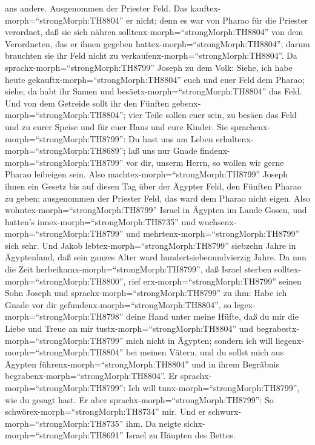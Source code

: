 ans andere.  Ausgenommen der Priester Feld. Das
kauftex-morph=``strongMorph:TH8804'' er nicht; denn es war von Pharao
für die Priester verordnet, daß sie sich nähren
solltenx-morph=``strongMorph:TH8804'' von dem Verordneten, das er ihnen
gegeben hattex-morph=``strongMorph:TH8804''; darum brauchten sie ihr
Feld nicht zu verkaufenx-morph=``strongMorph:TH8804''.  Da
sprachx-morph=``strongMorph:TH8799'' Joseph zu dem Volk: Siehe, ich habe
heute gekauftx-morph=``strongMorph:TH8804'' euch und euer Feld dem
Pharao; siehe, da habt ihr Samen und
besäetx-morph=``strongMorph:TH8804'' das Feld.  Und von dem
Getreide sollt ihr den Fünften gebenx-morph=``strongMorph:TH8804''; vier
Teile sollen euer sein, zu besäen das Feld und zu eurer Speise und für
euer Haus und eure Kinder.  Sie
sprachenx-morph=``strongMorph:TH8799'': Du hast uns am Leben
erhaltenx-morph=``strongMorph:TH8689''; laß uns nur Gnade
findenx-morph=``strongMorph:TH8799'' vor dir, unserm Herrn, so wollen
wir gerne Pharao leibeigen sein.  Also
machtex-morph=``strongMorph:TH8799'' Joseph ihnen ein Gesetz bis auf
diesen Tag über der Ägypter Feld, den Fünften Pharao zu geben;
ausgenommen der Priester Feld, das ward dem Pharao nicht eigen.
 Also wohntex-morph=``strongMorph:TH8799'' Israel in
Ägypten im Lande Gosen, und hatten's innex-morph=``strongMorph:TH8735''
und wuchsenx-morph=``strongMorph:TH8799'' und
mehrtenx-morph=``strongMorph:TH8799'' sich sehr.  Und Jakob
lebtex-morph=``strongMorph:TH8799'' siebzehn Jahre in Ägyptenland, daß
sein ganzes Alter ward hundertsiebenundvierzig Jahre.  Da
nun die Zeit herbeikamx-morph=``strongMorph:TH8799'', daß Israel sterben
solltex-morph=``strongMorph:TH8800'', rief
erx-morph=``strongMorph:TH8799'' seinen Sohn Joseph und
sprachx-morph=``strongMorph:TH8799'' zu ihm: Habe ich Gnade vor dir
gefundenx-morph=``strongMorph:TH8804'', so
legex-morph=``strongMorph:TH8798'' deine Hand unter meine Hüfte, daß du
mir die Liebe und Treue an mir tustx-morph=``strongMorph:TH8804'' und
begrabestx-morph=``strongMorph:TH8799'' mich nicht in Ägypten;
 sondern ich will liegenx-morph=``strongMorph:TH8804'' bei
meinen Vätern, und du sollst mich aus Ägypten
führenx-morph=``strongMorph:TH8804'' und in ihrem Begräbnis
begrabenx-morph=``strongMorph:TH8804''. Er
sprachx-morph=``strongMorph:TH8799'': Ich will
tunx-morph=``strongMorph:TH8799'', wie du gesagt hast.  Er
aber sprachx-morph=``strongMorph:TH8799'': So
schwörex-morph=``strongMorph:TH8734'' mir. Und er
schwurx-morph=``strongMorph:TH8735'' ihm. Da neigte
sichx-morph=``strongMorph:TH8691'' Israel zu Häupten des Bettes.


